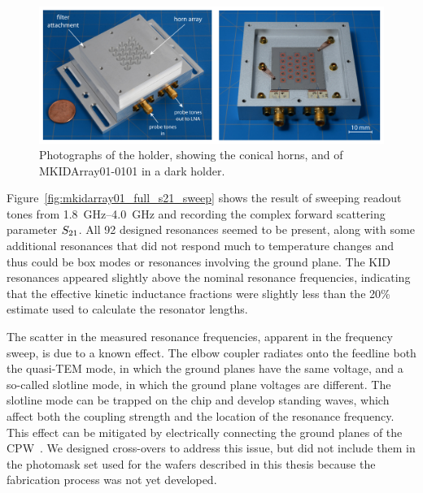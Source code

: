 \begin{figure}[htb]
\centering
\includegraphics[width=\textwidth]{multichroic/mkidarray01_in_dark_and_horn.pdf}
\caption[Photographs of the holder, showing the conical horns, and of MKIDArray01-0101 in a dark holder.]
{
Photographs of the holder, showing the conical horns, and of MKIDArray01-0101 in a dark holder.
}
\label{fig:mkidarray01_in_dark_and_horn}
\end{figure}

Figure~\ref{fig:mkidarray01_full_s21_sweep} shows the result of sweeping readout tones from \SIrange{1.8}{4.0}{GHz} and recording the complex forward scattering parameter $S_{21}$.
All 92 designed resonances seemed to be present, along with some additional resonances that did not respond much to temperature changes and thus could be box modes or resonances involving the ground plane.
The KID resonances appeared slightly above the nominal resonance frequencies, indicating that the effective kinetic inductance fractions were slightly less than the 20\% estimate used to calculate the resonator lengths.

The scatter in the measured resonance frequencies, apparent in the frequency sweep, is due to a known effect.
The elbow coupler radiates onto the feedline both the quasi-TEM mode, in which the ground planes have the same voltage, and a so-called slotline mode, in which the ground plane voltages are different.
The slotline mode can be trapped on the chip and develop standing waves, which affect both the coupling strength and the location of the resonance frequency.
This effect can be mitigated by electrically connecting the ground planes of the CPW~\autocite{Mates2011, Yates2014JLTP}.
We designed cross-overs to address this issue, but did not include them in the photomask set used for the wafers described in this thesis because the fabrication process was not yet developed.

